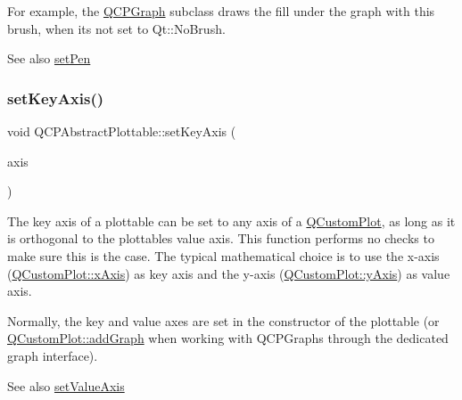 For example, the \mbox{\hyperlink{class_q_c_p_graph}{Q\+C\+P\+Graph}} subclass draws the fill under the graph with this brush, when it\textquotesingle{}s not set to Qt\+::\+No\+Brush.

\begin{DoxySeeAlso}{See also}
\mbox{\hyperlink{class_q_c_p_abstract_plottable_ab74b09ae4c0e7e13142fe4b5bf46cac7}{set\+Pen}} 
\end{DoxySeeAlso}
\mbox{\label{class_q_c_p_abstract_plottable_a8524fa2994c63c0913ebd9bb2ffa3920}} 
\subsubsection{\texorpdfstring{set\+Key\+Axis()}{setKeyAxis()}}
{\footnotesize\ttfamily void Q\+C\+P\+Abstract\+Plottable\+::set\+Key\+Axis (\begin{DoxyParamCaption}\item[{\mbox{\hyperlink{class_q_c_p_axis}{Q\+C\+P\+Axis}} $\ast$}]{axis }\end{DoxyParamCaption})}

The key axis of a plottable can be set to any axis of a \mbox{\hyperlink{class_q_custom_plot}{Q\+Custom\+Plot}}, as long as it is orthogonal to the plottable\textquotesingle{}s value axis. This function performs no checks to make sure this is the case. The typical mathematical choice is to use the x-\/axis (\mbox{\hyperlink{class_q_custom_plot_a9a79cd0158a4c7f30cbc702f0fd800e4}{Q\+Custom\+Plot\+::x\+Axis}}) as key axis and the y-\/axis (\mbox{\hyperlink{class_q_custom_plot_af6fea5679725b152c14facd920b19367}{Q\+Custom\+Plot\+::y\+Axis}}) as value axis.

Normally, the key and value axes are set in the constructor of the plottable (or \mbox{\hyperlink{class_q_custom_plot_a6fb2873d35a8a8089842d81a70a54167}{Q\+Custom\+Plot\+::add\+Graph}} when working with Q\+C\+P\+Graphs through the dedicated graph interface).

\begin{DoxySeeAlso}{See also}
\mbox{\hyperlink{class_q_c_p_abstract_plottable_a71626a07367e241ec62ad2c34baf21cb}{set\+Value\+Axis}} 
\end{DoxySeeAlso}
\mbox{\label{class_q_c_p_abstract_plottable_ab79c7ba76bc7fa89a4b3580e12149f1f}} 
